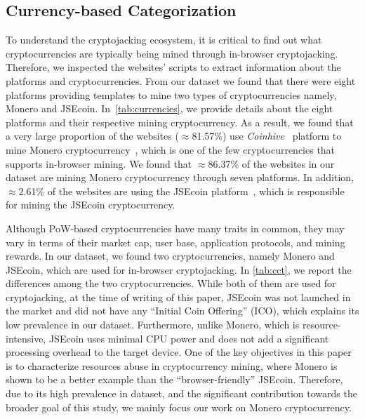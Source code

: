 \documentclass[acmlarge]{acmart}
\newcommand{\ch}{{\em Coinhive}\xspace}
\newcommand{\az}[1]{{\textcolor{blue}{[#1]}}}
\newcommand{\am}[1]{\textcolor{green!50!black}{[#1]}}
\newcommand{\cc}{{cryptocurrency}\xspace}
\newcommand{\cj}{cryptojacking\xspace}
\newcommand{\etal}{{\em et al.}\xspace}
\begin{document}
\subsection{Currency-based Categorization} To understand the \cj ecosystem, it is critical to find out what cryptocurrencies are typically being mined through in-browser \cj. Therefore, we inspected the websites' scripts to extract information about the platforms and cryptocurrencies.
From our dataset we found that there were eight platforms providing templates to mine two types of cryptocurrencies namely, Monero and JSEcoin. In~\autoref{tab:currencies}, we provide details about the eight platforms and their respective mining \cc. As a result, we found that a very large proportion of the websites ($\approx$81.57\%) use \ch~\cite{coinhive} platform to mine Monero \cc~\cite{Monero}, which is one of the few cryptocurrencies that supports in-browser mining. We found that $\approx$86.37\% of the websites in our dataset are mining Monero \cc through seven platforms. In addition, $\approx$2.61\% of the websites are using the JSEcoin platform~\cite{JSEcoin}, which is responsible for mining the JSEcoin \cc. 

Although PoW-based cryptocurrencies have many traits in common, they may vary in terms of their market cap, user base, application protocols, and mining rewards. In our dataset, we found two cryptocurrencies, namely Monero and JSEcoin, which are used for in-browser \cj. In \autoref{tab:cct}, we report the differences among the two cryptocurrencies. While both of them are used for \cj, %
at the time of writing of this paper, JSEcoin was not launched in the market and did not have any ``Initial Coin Offering'' (ICO), which explains its low prevalence in our dataset. Furthermore, unlike Monero, which is resource-intensive, JSEcoin uses minimal CPU power and does not add a significant processing overhead to the target device. One of the key objectives in this paper is to characterize resources abuse in \cc mining, where Monero is shown to be a better example than the ``browser-friendly'' JSEcoin. Therefore, due to its high prevalence in dataset, and the significant contribution towards the broader goal of this study, we mainly focus our work on Monero \cc. %


\end{document}
